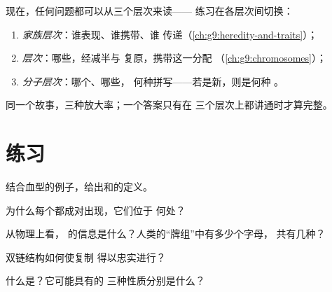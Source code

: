 \begin{method}[三层次阅读]\label{met:g9:genes-and-dna:levels}
现在，任何问题都可以从三个层次来读——
练习在各层次间切换：
\begin{enumerate}
  \item \emph{家族层次}：谁表现、谁携带、谁
        传递（\cref{ch:g9:heredity-and-traits}）；
  \item \emph{层次}：哪些，经减半与
        复原，携带这一分配
        （\cref{ch:g9:chromosomes}）；
  \item \emph{分子层次}：哪个、哪些，
        何种拼写——若是新，则是何种
        。
\end{enumerate}
同一个故事，三种放大率；一个答案只有在
三个层次上都讲通时才算完整。
\end{method}

\section{练习}

\begin{exercise}[$\star$]\label{exo:g9:genes-and-dna:1}
结合血型的例子，给出和的定义。
\end{exercise}

\begin{exercise}[$\star$]\label{exo:g9:genes-and-dna:2}
为什么每个都成对出现，它们位于
何处？
\end{exercise}

\begin{exercise}[$\star$]\label{exo:g9:genes-and-dna:3}
从物理上看， 的信息是什么？人类的“牌组”中有多少个字母，
共有几种？
\end{exercise}

\begin{exercise}[$\star$]\label{exo:g9:genes-and-dna:4}
双链结构如何使复制
得以忠实进行？
\end{exercise}

\begin{exercise}[$\star$]\label{exo:g9:genes-and-dna:5}
什么是？它可能具有的
三种性质分别是什么？
\end{exercise}

